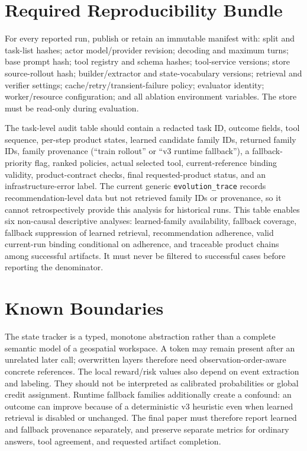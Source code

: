 \documentclass[10pt]{article}
\begin{document}
\section{Required Reproducibility Bundle}
For every reported run, publish or retain an immutable manifest with: split and task-list hashes; actor model/provider revision; decoding and maximum turns; base prompt hash; tool registry and schema hashes; tool-service versions; store source-rollout hash; builder/extractor and state-vocabulary versions; retrieval and verifier settings; cache/retry/transient-failure policy; evaluator identity; worker/resource configuration; and all ablation environment variables. The store must be read-only during evaluation.

The task-level audit table should contain a redacted task ID, outcome fields, tool sequence, per-step product states, learned candidate family IDs, returned family IDs, family provenance (``train rollout'' or ``v3 runtime fallback''), a fallback-priority flag, ranked policies, actual selected tool, current-reference binding validity, product-contract checks, final requested-product status, and an infrastructure-error label. The current generic \texttt{evolution\_trace} records recommendation-level data but not retrieved family IDs or provenance, so it cannot retrospectively provide this analysis for historical runs. This table enables six non-causal descriptive analyses: learned-family availability, fallback coverage, fallback suppression of learned retrieval, recommendation adherence, valid current-run binding conditional on adherence, and traceable product chains among successful artifacts. It must never be filtered to successful cases before reporting the denominator.

\section{Known Boundaries}
The state tracker is a typed, monotone abstraction rather than a complete semantic model of a geospatial workspace. A token may remain present after an unrelated later call; overwritten layers therefore need observation-order-aware concrete references. The local reward/risk values also depend on event extraction and labeling. They should not be interpreted as calibrated probabilities or global credit assignment. Runtime fallback families additionally create a confound: an outcome can improve because of a deterministic v3 heuristic even when learned retrieval is disabled or unchanged. The final paper must therefore report learned and fallback provenance separately, and preserve separate metrics for ordinary answers, tool agreement, and requested artifact completion.
\end{document}
